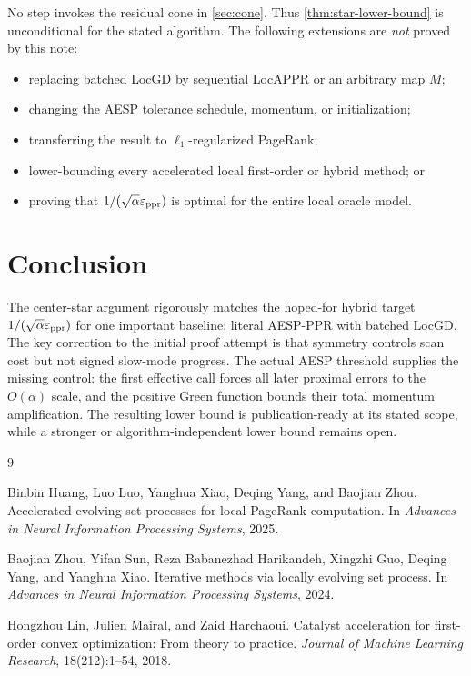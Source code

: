 \documentclass[11pt]{article}
\begin{document}
No step invokes the residual cone in \cref{sec:cone}.  Thus
\cref{thm:star-lower-bound} is unconditional for the stated algorithm.  The
following extensions are \emph{not} proved by this note:
\begin{itemize}[leftmargin=*]
\item replacing batched LocGD by sequential LocAPPR or an arbitrary map $M$;
\item changing the AESP tolerance schedule, momentum, or initialization;
\item transferring the result to $\ell_1$-regularized PageRank;
\item lower-bounding every accelerated local first-order or hybrid method; or
\item proving that $1/(\sqrt\alpha\varepsilon_{\mathrm{ppr}})$ is optimal for the entire local
      oracle model.
\end{itemize}

\section{Conclusion}

The center-star argument rigorously matches the hoped-for hybrid target
$1/(\sqrt\alpha\varepsilon_{\mathrm{ppr}})$ for one important baseline: literal AESP-PPR with
batched LocGD.  The key correction to the initial proof attempt is that
symmetry controls scan cost but not signed slow-mode progress.  The actual
AESP threshold supplies the missing control: the first effective call forces
all later proximal errors to the $O(\alpha)$ scale, and the positive Green
function bounds their total momentum amplification.  The resulting lower
bound is publication-ready at its stated scope, while a stronger or
algorithm-independent lower bound remains open.

\footnotesize
\begin{thebibliography}{9}

Binbin Huang, Luo Luo, Yanghua Xiao, Deqing Yang, and Baojian Zhou.
\newblock Accelerated evolving set processes for local PageRank computation.
\newblock In \emph{Advances in Neural Information Processing Systems}, 2025.

Baojian Zhou, Yifan Sun, Reza Babanezhad Harikandeh, Xingzhi Guo, Deqing Yang,
and Yanghua Xiao.
\newblock Iterative methods via locally evolving set process.
\newblock In \emph{Advances in Neural Information Processing Systems}, 2024.

Hongzhou Lin, Julien Mairal, and Zaid Harchaoui.
\newblock Catalyst acceleration for first-order convex optimization: From
theory to practice.
\newblock \emph{Journal of Machine Learning Research}, 18(212):1--54, 2018.

\end{thebibliography}
\end{document}
